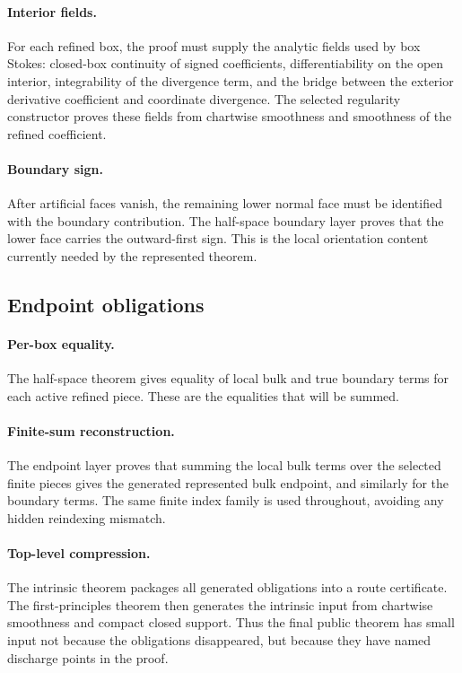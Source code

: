 \paragraph{Interior fields.}
For each refined box, the proof must supply the analytic fields used by box
Stokes: closed-box continuity of signed coefficients, differentiability on the
open interior, integrability of the divergence term, and the bridge between
the exterior derivative coefficient and coordinate divergence.  The selected
regularity constructor proves these fields from chartwise smoothness and
smoothness of the refined coefficient.

\paragraph{Boundary sign.}
After artificial faces vanish, the remaining lower normal face must be
identified with the boundary contribution.  The half-space boundary layer
proves that the lower face carries the outward-first sign.  This is the local
orientation content currently needed by the represented theorem.

\subsection{Endpoint obligations}

\paragraph{Per-box equality.}
The half-space theorem gives equality of local bulk and true boundary terms
for each active refined piece.  These are the equalities that will be summed.

\paragraph{Finite-sum reconstruction.}
The endpoint layer proves that summing the local bulk terms over the selected
finite pieces gives the generated represented bulk endpoint, and similarly for
the boundary terms.  The same finite index family is used throughout, avoiding
any hidden reindexing mismatch.

\paragraph{Top-level compression.}
The intrinsic theorem packages all generated obligations into a route
certificate.  The first-principles theorem then generates the intrinsic input
from chartwise smoothness and compact closed support.  Thus the final public
theorem has small input not because the obligations disappeared, but because
they have named discharge points in the proof.
